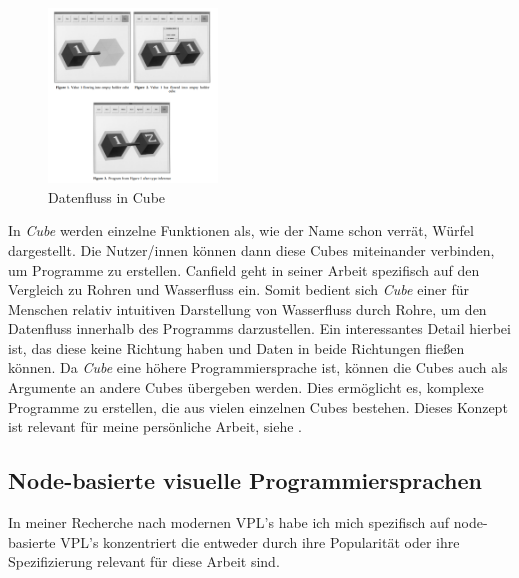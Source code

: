 \documentclass[ngerman]{article}
\begin{document}
\begingroup
\setlength\intextsep{2pt}

\begin{minipage}{\linewidth}
\begin{figure}
  \centering
  \includegraphics[width=0.4\textwidth]{./graphics/cube_vpl.png} %
  \caption{Datenfluss in Cube \cite{najork1996programming}}
  \label{fig:cube_demo}
\end{figure}
    \cite{najork1996programming}
In \textit{Cube} werden einzelne Funktionen als, wie der Name schon verrät, Würfel dargestellt. Die Nutzer/innen können dann diese Cubes miteinander verbinden, um Programme zu erstellen.
Canfield geht in seiner Arbeit spezifisch auf den Vergleich zu Rohren und Wasserfluss ein. Somit bedient sich \textit{Cube} einer für Menschen relativ intuitiven Darstellung von Wasserfluss durch Rohre, um den Datenfluss innerhalb des Programms darzustellen.
  Ein interessantes Detail hierbei ist, das diese  keine Richtung haben und Daten in beide Richtungen fließen können. 
Da \textit{Cube} eine höhere Programmiersprache ist, können die Cubes auch als Argumente an andere Cubes übergeben werden. Dies ermöglicht es, komplexe Programme zu erstellen, die aus vielen einzelnen Cubes bestehen. 
\br
Dieses Konzept ist relevant für meine persönliche Arbeit, siehe .

\end{minipage}
\endgroup
\pagebreak

\subsection{Node-basierte visuelle Programmiersprachen}
In meiner Recherche nach modernen VPL's habe ich mich spezifisch auf node-basierte VPL's konzentriert die entweder durch ihre Popularität oder ihre Spezifizierung relevant für diese Arbeit sind.
\end{document}
